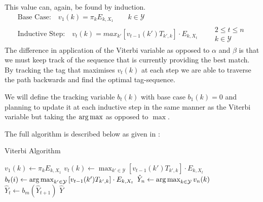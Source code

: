 \documentclass[../main.tex]{subfiles}
\begin{document}
This value can, again, be found by induction.
\begin{gather*}
    \text{Base Case:} \quad v_1(k) = \pi_k E_{k, X_1} \qquad k \in \mathcal{Y} \\
    \text{Inductive Step:} \quad v_{t}(k) = max_{k'} \left[ v_{t-1}(k') T_{k',k}\right] \cdot E_{k,X_t} \qquad
        \begin{array}{lr}
            2 \leq t \leq n\\
            k \in \mathcal{Y}
        \end{array}
\end{gather*}
The difference in application of the Viterbi variable as opposed to $\alpha$ and $\beta$ is that we must keep track of the sequence that is currently providing the best match.
By tracking the tag that maximises $v_t(k)$ at each step we are able to traverse the path backwards and find the optimal tag-sequence.

We will define the tracking variable $b_t(k)$ with base case $b_1(k)=0$ and planning to update it at each inductive step in the same manner as the Viterbi variable but taking the $\operatorname*{arg\,max}$ as opposed to $\max$.

The full algorithm is described below as given in \autocite{eisenstein-nlp-2019}:
\begin{algorithm}
\caption{Viterbi Algorithm} \label{alg:Viterbi}
\begin{algorithmic}
    \State $v_1(k) \gets \pi_k E_{k, X_1}$
\EndFor
{}
    \State $v_t(k) \gets \max_{k' \in \mathcal{Y}} \left[ v_{t-1}(k') T_{k',k} \right] \cdot E_{k,X_t}$
    \State $b_t(i) \gets \operatorname*{arg\,max}_{k' \in \mathcal{Y}} \left[ v_{t-1}(k') T_{k',k} \right] \cdot E_{k,X_t}$
\EndFor
\EndFor
\State $\hat{Y}_n \gets \operatorname*{arg\,max}_{k \in \mathcal{Y}} v_n(k)$
    \State $\hat{Y}_t \gets b_m(\hat{Y}_{t+1})$
\EndFor
\State \Return $\hat{Y}$
\end{algorithmic}
\end{algorithm}

\end{document}
